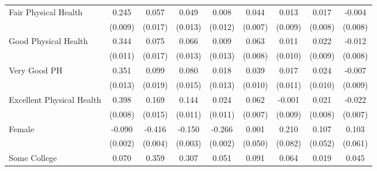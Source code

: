 \documentclass[border=3mm,preview]{standalone}
\begin{document}
\begin{landscape}
\begin{table}
\begin{tabular}{l*{8}{c}}
\midrule
Fair Physical Health&       0.245\sym{***}&       0.057\sym{***}&       0.049\sym{***}&       0.008         &       0.044\sym{***}&       0.013         &       0.017\sym{*}  &      -0.004         \\
                    &     (0.009)         &     (0.017)         &     (0.013)         &     (0.012)         &     (0.007)         &     (0.009)         &     (0.008)         &     (0.008)         \\
Good Physical Health&       0.344\sym{***}&       0.075\sym{***}&       0.066\sym{***}&       0.009         &       0.063\sym{***}&       0.011         &       0.022\sym{*}  &      -0.012         \\
                    &     (0.011)         &     (0.017)         &     (0.013)         &     (0.013)         &     (0.008)         &     (0.010)         &     (0.009)         &     (0.008)         \\
Very Good PH        &       0.351\sym{***}&       0.099\sym{***}&       0.080\sym{***}&       0.018         &       0.039\sym{***}&       0.017         &       0.024\sym{*}  &      -0.007         \\
                    &     (0.013)         &     (0.019)         &     (0.015)         &     (0.013)         &     (0.010)         &     (0.011)         &     (0.010)         &     (0.009)         \\
Excellent Physical Health&       0.398\sym{***}&       0.169\sym{***}&       0.144\sym{***}&       0.024\sym{*}  &       0.062\sym{***}&      -0.001         &       0.021\sym{**} &      -0.022\sym{**} \\
                    &     (0.008)         &     (0.015)         &     (0.011)         &     (0.011)         &     (0.007)         &     (0.009)         &     (0.008)         &     (0.007)         \\
\midrule
Female              &      -0.090\sym{***}&      -0.416\sym{***}&      -0.150\sym{***}&      -0.266\sym{***}&       0.001         &       0.210\sym{*}  &       0.107\sym{*}  &       0.103         \\
                    &     (0.002)         &     (0.004)         &     (0.003)         &     (0.002)         &     (0.050)         &     (0.082)         &     (0.052)         &     (0.061)         \\
Some College             &       0.070\sym{***}&       0.359\sym{***}&       0.307\sym{***}&       0.051\sym{***}&       0.091\sym{***}&       0.064\sym{**} &       0.019         &       0.045\sym{**} \\

\end{tabular}
\end{table}
\end{landscape}
\end{document}
